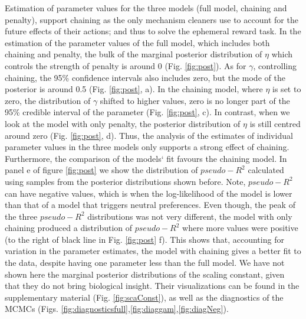 \documentclass[]{rsos}%
\begin{document}
Estimation of parameter values for the three models (full model,
chaining and penalty), support chaining as the only mechanism
cleaners use to account for the future effects of their actions;
and thus to solve the ephemeral reward task. In the estimation of the
parameter values of the full model, which includes both chaining and
penalty, the bulk of the marginal posterior distribution of \(\eta\) which
controls the strength of penalty is around 0 (Fig. \ref{fig:post}).
As for \(\gamma\), controlling chaining, the 95\% confidence
intervals also includes zero, but the mode of the posterior
is around 0.5 (Fig. \ref{fig:post}, a). In the chaining model,
where \(\eta\) is set to zero, the distribution of \(\gamma\) shifted
to higher values, zero is no longer part of the 95\% credible interval
of the parameter (Fig. \ref{fig:post}, c). In contrast, when we
look at the model with only penalty, the posterior distribution
of \(\eta\) is still centred around zero (Fig. \ref{fig:post}, d).
Thus, the analysis of the estimates of individual parameter
values in the three models only supports a strong
effect of chaining. Furthermore, the comparison of the models` fit
favours the chaining model. In panel e of figure \ref{fig:post}
we show the distribution of \(pseudo-R^2\) calculated using
samples from the posterior distributions shown before.
Note, \(pseudo-R^2\) can have negative values, which is when
the log-likelihood of the model is lower than that of a model that
triggers neutral preferences. Even though, the peak of the three
\(pseudo-R^2\) distributions was not very different, the model with only
chaining produced a distribution of \(pseudo-R^2\) where more values
were positive (to the right of black line in Fig. \ref{fig:post} f). This
shows that, accounting for variation in the parameter estimates, the
model with chaining gives a better fit to the data, despite
having one parameter less than the full model. We have not shown
here the marginal posterior distributions of the scaling constant,
given that they do not bring biological insight.
Their visualizations can be found in the supplementary
material (Fig. \ref{fig:scaConst}), as well as the diagnostics of the MCMCs
(Figs. \ref{fig:diagnosticsfull},\ref{fig:diaggam},\ref{fig:diagNeg}).
\end{document}
